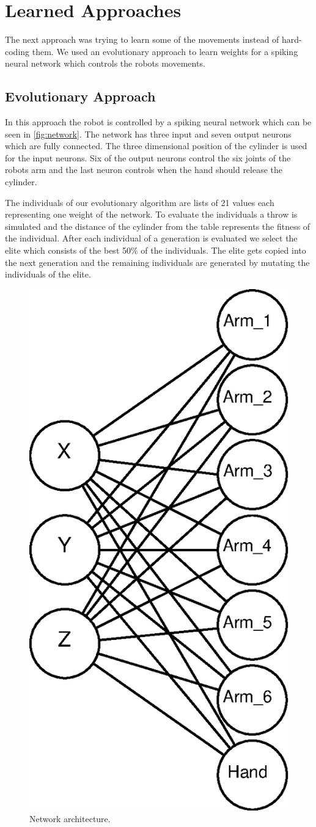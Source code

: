\section{Learned Approaches}
The next approach was trying to learn some of the movements instead of hard-coding them.
We used an evolutionary approach to learn weights for a spiking neural network which controls the robots movements.

\subsection{Evolutionary Approach}
In this approach the robot is controlled by a spiking neural network which can be seen in \autoref{fig:network}.
The network has three input and seven output neurons which are fully connected.
The three dimensional position of the cylinder is used for the input neurons.
Six of the output neurons control the six joints of the robots arm and the last neuron controls when the hand should release the cylinder.

The individuals of our evolutionary algorithm are lists of 21 values each representing one weight of the network.
To evaluate the individuals a throw is simulated and the distance of the cylinder from the table represents the fitness of the individual.
After each individual of a generation is evaluated we select the elite which consists of the best 50\% of the individuals.
The elite gets copied into the next generation and the remaining individuals are generated by mutating the individuals of the elite.

\begin{figure}[h]
\centering
\includegraphics[width=.5\columnwidth]{figures/net.eps}
\caption{Network architecture.}
\label{fig:network}
\end{figure}

